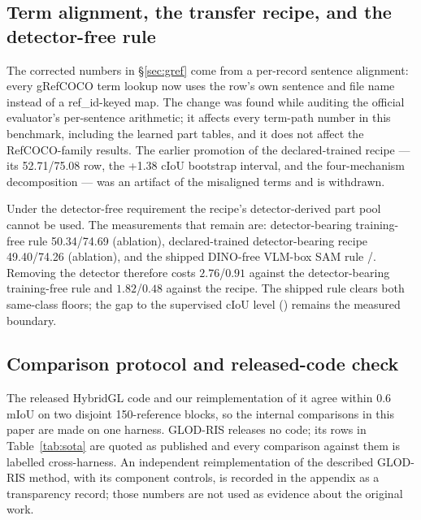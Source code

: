 \subsection{Term alignment, the transfer recipe, and the detector-free rule}
\label{sec:transferwall}
The corrected numbers in \S\ref{sec:gref} come from a per-record sentence
alignment: every gRefCOCO term lookup now uses the row's own sentence and file
name instead of a ref\_id-keyed map. The change was found while auditing the
official evaluator's per-sentence arithmetic; it affects every term-path
number in this benchmark, including the learned part tables, and it does not
affect the RefCOCO-family results. The earlier promotion of the
declared-trained recipe --- its 52.71/75.08 row, the +1.38 cIoU bootstrap
interval, and the four-mechanism decomposition --- was an artifact of the
misaligned terms and is withdrawn.

Under the detector-free requirement the recipe's detector-derived part pool
cannot be used. The measurements that remain are: detector-bearing
training-free rule 50.34/74.69 (ablation), declared-trained detector-bearing
recipe 49.40/74.26 (ablation), and the shipped DINO-free VLM-box SAM rule
\grefCIoU{}/\grefGIoU{}. Removing the detector therefore costs $2.76$/$0.91$
against the detector-bearing training-free rule and $1.82$/$0.48$ against the
recipe. The shipped rule clears both same-class floors; the gap to the
supervised cIoU level (\grefPubCIoU) remains the measured boundary.

\subsection{Comparison protocol and released-code check}
\label{sec:repro}
The released HybridGL code and our reimplementation of it agree within
$0.6$\,mIoU on two disjoint 150-reference blocks, so the internal comparisons
in this paper are made on one harness. GLOD-RIS releases no code; its rows in
Table~\ref{tab:sota} are quoted as published and every comparison against
them is labelled cross-harness. An independent reimplementation of the
described GLOD-RIS method, with its component controls, is recorded in
the appendix as a transparency record; those numbers are not used
as evidence about the original work.

